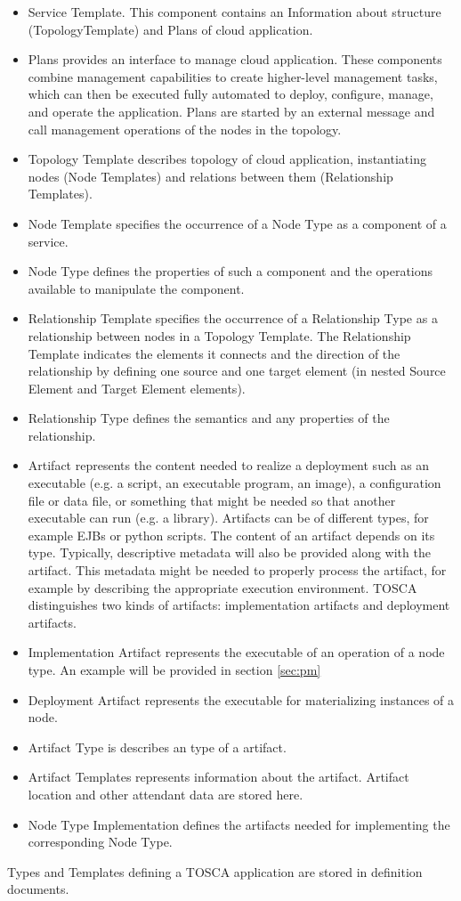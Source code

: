 \begin{itemize}
\item Service Template. 
	This component contains an Information about structure (TopologyTemplate) and Plans of cloud application.
\item Plans provides an interface to manage cloud application.
These components combine management capabilities to create higher-level management tasks, which can then be executed fully automated to deploy, configure, manage, and operate the application.
Plans are started by an external message and call management operations of the nodes in the topology.
\item Topology Template describes topology of cloud application, instantiating nodes (Node Templates) and relations between them (Relationship Templates).
\item Node Template specifies the occurrence of a Node Type as a component of a service.
\item Node Type defines the properties of such a component and the operations available to manipulate the component.
\item Relationship Template specifies the occurrence of a Relationship Type as a relationship between nodes in a Topology Template. 
	The Relationship Template indicates the elements it connects and the direction of the relationship by defining one source and one target element (in nested Source Element and Target Element elements).
\item Relationship Type defines the semantics and any properties of the relationship. \label{subs:reltype}
\item Artifact  represents the content needed to realize a deployment such as an executable (e.g. a script, an executable program, an image), a configuration file or data file, or something that might be needed so that another executable can run (e.g. a library).
	Artifacts can be of different types, for example EJBs or python scripts.
	The content of an artifact depends on its type. 
	Typically, descriptive metadata will also be provided along with the artifact.
	This metadata might be needed to properly process the artifact, for example by describing the appropriate execution environment.
	TOSCA distinguishes two kinds of artifacts: implementation artifacts and deployment artifacts.
\item Implementation Artifact represents the executable of an operation of a node type. An example will be provided in section \ref{sec:pm}
\item Deployment Artifact represents the executable for materializing instances of a node.
\item Artifact Type is describes an type of a artifact.
\item Artifact Templates represents information about the artifact. 
	Artifact location and other attendant data are stored here.
\item Node Type Implementation defines the artifacts needed for implementing the corresponding Node Type.
\end{itemize}
Types and Templates defining a TOSCA application are stored in definition documents.

